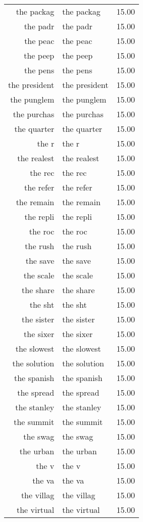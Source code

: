 \begin{table}[ht]
\begin{tabular}{rlr}
  the packag & the packag & 15.00 \\ 
  the padr & the padr & 15.00 \\ 
  the peac & the peac & 15.00 \\ 
  the peep & the peep & 15.00 \\ 
  the pens & the pens & 15.00 \\ 
  the president & the president & 15.00 \\ 
  the punglem & the punglem & 15.00 \\ 
  the purchas & the purchas & 15.00 \\ 
  the quarter & the quarter & 15.00 \\ 
  the r & the r & 15.00 \\ 
  the realest & the realest & 15.00 \\ 
  the rec & the rec & 15.00 \\ 
  the refer & the refer & 15.00 \\ 
  the remain & the remain & 15.00 \\ 
  the repli & the repli & 15.00 \\ 
  the roc & the roc & 15.00 \\ 
  the rush & the rush & 15.00 \\ 
  the save & the save & 15.00 \\ 
  the scale & the scale & 15.00 \\ 
  the share & the share & 15.00 \\ 
  the sht & the sht & 15.00 \\ 
  the sister & the sister & 15.00 \\ 
  the sixer & the sixer & 15.00 \\ 
  the slowest & the slowest & 15.00 \\ 
  the solution & the solution & 15.00 \\ 
  the spanish & the spanish & 15.00 \\ 
  the spread & the spread & 15.00 \\ 
  the stanley & the stanley & 15.00 \\ 
  the summit & the summit & 15.00 \\ 
  the swag & the swag & 15.00 \\ 
  the urban & the urban & 15.00 \\ 
  the v & the v & 15.00 \\ 
  the va & the va & 15.00 \\ 
  the villag & the villag & 15.00 \\ 
  the virtual & the virtual & 15.00 \\ 

\end{tabular}
\end{table}
